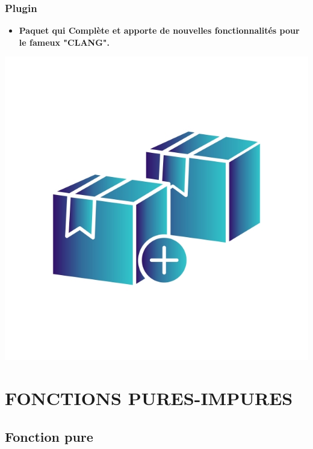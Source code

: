 \documentclass[hyperref={bookmarks=false},aspectratio=169]{beamer}
\begin{document}
\begin{frame}
\frametitle{Plugin}
\begin{itemize}
    \item  \textbf{ Paquet qui Complète et apporte de nouvelles fonctionnalités pour le fameux "CLANG".}
\end{itemize}


\vfill
\begin{center} \includegraphics[scale=0.3]{./figures/pack.jpg} \\[2cm] \end{center}
\vfill


\end{frame}


\section{FONCTIONS PURES-IMPURES}


\subsection{Fonction pure}
\end{document}
